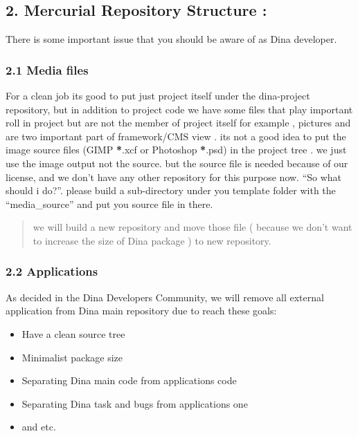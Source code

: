 \documentclass[letterpaper,10pt,english]{manual}
\begin{document}
\subsection{2. Mercurial Repository Structure :}

There is some important issue that you should be aware of as Dina developer.


\subsubsection{2.1 Media files}

For a clean job its good to put just project itself under the dina-project repository,
but in addition to project code we have some files that play important roll in project
but are not the member of project itself for example , pictures and  are two important
part of framework/CMS view . its not a good idea to put the image source files (GIMP {\color{red}\bfseries{}*}.xcf
or Photoshop {\color{red}\bfseries{}*}.psd) in the project tree . we just use the image output not the source.
but the source file is needed because of our license, and we don't have any other
repository for this purpose now. ``So what should i do?''. please build a sub-directory
under you template folder with the ``media\_source'' and put you source file in there.
\begin{quote}

we will build a new repository and move those file ( because we don't want to increase
the size of Dina package ) to new repository.
\end{quote}


\subsubsection{2.2 Applications}

As decided in the Dina Developers Community, we will remove all external application
from Dina main repository due to reach these goals:
\begin{itemize}
\item {} 
Have a clean source tree

\item {} 
Minimalist package size

\item {} 
Separating Dina main code from applications code

\item {} 
Separating Dina task and bugs from applications one

\item {} 
and etc.

\end{itemize}
\end{document}
